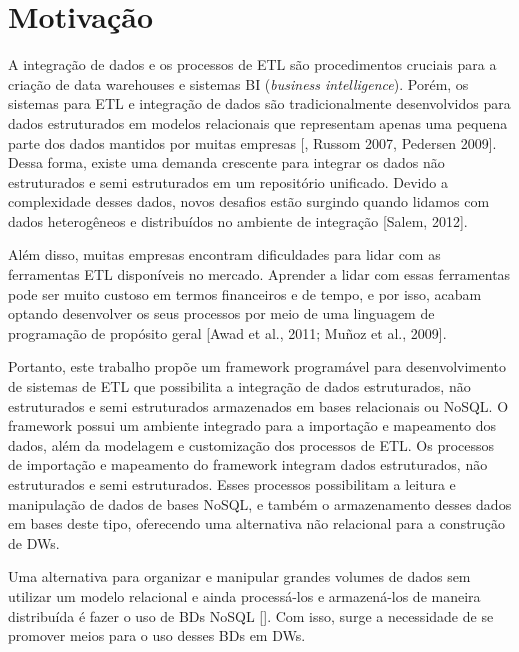 %

\section{Motivação}

A integração de dados e os processos de ETL são procedimentos cruciais para a criação de data warehouses e sistemas BI (\textit{business intelligence}). Porém, os sistemas para ETL e integração de dados são tradicionalmente desenvolvidos para dados estruturados em modelos relacionais que representam apenas uma pequena parte dos dados mantidos por muitas empresas [\cite{darmont:2005}, Russom 2007, Pedersen 2009]. Dessa forma, existe uma demanda crescente para integrar os dados não estruturados e semi estruturados em um repositório unificado. Devido a complexidade desses dados, novos desafios estão surgindo quando lidamos com dados heterogêneos e distribuídos no ambiente de integração [Salem, 2012].

Além disso, muitas empresas encontram dificuldades para lidar com as ferramentas ETL disponíveis no mercado. Aprender a lidar com essas ferramentas pode ser muito custoso em termos financeiros e de tempo, e por isso, acabam optando desenvolver os seus processos por meio de uma linguagem de programação de propósito geral [Awad et al., 2011; Muñoz et al., 2009].

Portanto, este trabalho propõe um framework programável para desenvolvimento de sistemas de ETL que possibilita a integração de dados estruturados, não estruturados e semi estruturados armazenados em bases relacionais ou NoSQL. O framework possui um ambiente integrado para a importação e mapeamento dos dados, além da modelagem e customização dos processos de ETL. Os processos de importação e mapeamento do framework integram dados estruturados, não estruturados e semi estruturados. Esses processos possibilitam a leitura e manipulação de dados de bases NoSQL, e também o armazenamento desses dados em bases deste tipo, oferecendo uma alternativa não relacional para a construção de DWs.

Uma alternativa para organizar e manipular grandes volumes de dados sem utilizar um modelo relacional e ainda processá-los e armazená-los de maneira distribuída é fazer o uso de BDs NoSQL [\cite{scabora:2016}]. Com isso, surge a necessidade de se promover meios para o uso desses BDs em DWs. 

